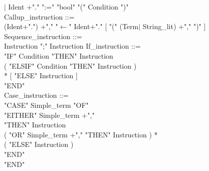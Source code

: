 \documentclass[12pt,a4paper,draft]{article}
\begin{document}
{\begin{sloppypar}
\hspace*{0.20in} $|$ Ident +"."   ":="  "bool" "(" Condition ")" \\
Callup\_instruction ::= \\
\hspace*{0.20in}  (Ident+".") +","  "$\leftarrow$"  Ident+"."  [ "(" (Term$|$ String\_lit) +","  ")" ] \\ %
Sequence\_instruction ::= \\
\hspace*{0.20in}Instruction  ";"  Instruction If\_instruction ::= \\
\hspace*{0.20in}  "IF"  Condition  "THEN"  Instruction  \\
\hspace*{0.20in}  ( "ELSIF"  Condition  "THEN"  Instruction )\\
\hspace*{0.20in}* [ "ELSE"  Instruction ] \\
  "END" \\
Case\_instruction ::= \\
\hspace*{0.20in}  "CASE"  Simple\_term  "OF"\\
\hspace*{0.20in}  "EITHER"  Simple\_term +","\\
\hspace*{0.20in}  "THEN"  Instruction  \\
\hspace*{0.20in}  ( "OR"  Simple\_term +","   "THEN"  Instruction ) *\\
\hspace*{0.20in}  ( "ELSE"  Instruction ) \\ %
\hspace*{0.20in}  "END"\\
\hspace*{0.20in}  "END" \\
  

\end{sloppypar}}
\end{document}
